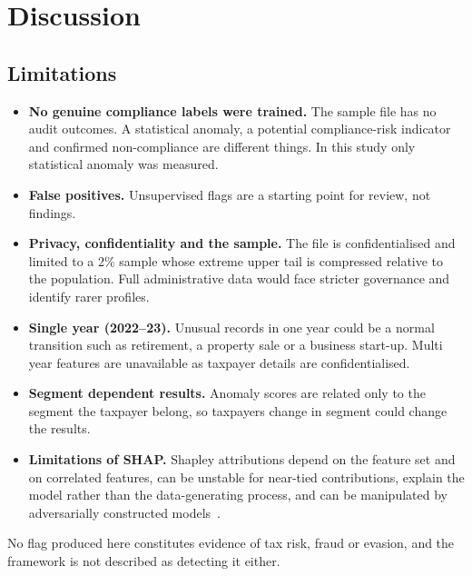 \section{Discussion}


\subsection{Limitations}

\begin{itemize}
    \item \textbf{No genuine compliance labels were trained.} The sample file has no audit outcomes. A statistical anomaly, a potential compliance-risk indicator and confirmed non-compliance are different things. In this study only statistical anomaly was measured.
    \item \textbf{False positives.} Unsupervised flags are a starting point for review, not findings.
    \item \textbf{Privacy, confidentiality and the sample.} The file is confidentialised and limited to a 2\% sample whose extreme upper tail is compressed relative to the population. Full administrative data would face stricter governance and identify rarer profiles.
    \item \textbf{Single year (2022--23).} Unusual records in one year could be a normal transition such as retirement, a property sale or a business start-up. Multi year features are unavailable as taxpayer details are confidentialised.
    \item \textbf{Segment dependent results.} Anomaly scores are related only to the segment the taxpayer belong, so taxpayers change in segment could change the results.
    \item \textbf{Limitations of SHAP.} Shapley attributions depend on the feature set and on correlated features, can be unstable for near-tied contributions, explain the model rather than the data-generating process, and can be manipulated by adversarially constructed models~\cite{kumar2020problems,slack2020fooling}.
\end{itemize}

No flag produced here constitutes evidence of tax risk, fraud or evasion, and the framework is not described as detecting it either.
